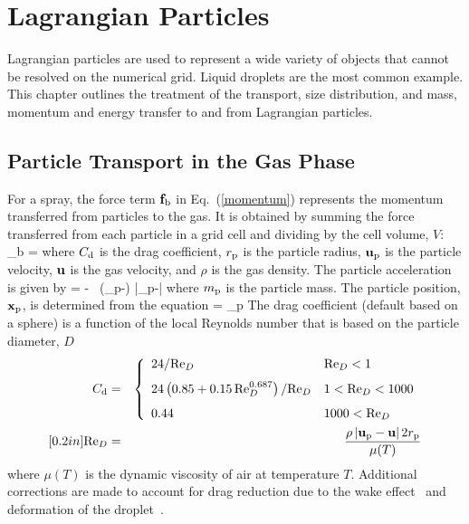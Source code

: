 
\chapter{Lagrangian Particles}
\label{chapter:lagrangian_particles}

Lagrangian particles are used to represent a wide variety of objects that cannot be resolved on
the numerical grid. Liquid droplets are the most common example. This chapter outlines the treatment of the transport, size
distribution, and mass, momentum and energy transfer to and from Lagrangian particles.

\section{Particle Transport in the Gas Phase}

For a spray, the force term ${\bf f}_{\rm b}$ in Eq.~(\ref{momentum})
represents the momentum transferred from particles to the gas.
It is obtained by summing the force transferred from each particle
in a grid cell and dividing by the cell volume, $V$:
\be
    {\bof_{\rm b}} =  \sum {}
\ee
where $C_{\rm d}$ is the drag coefficient, $r_{\rm p}$ is the particle radius, ${\bf u}_{\rm p}$ is the particle velocity, ${\bf u}$ is the
gas velocity, and $\rho$ is the gas density. The particle acceleration is given by
\be
     = \bg - \ha {} \,
    (\bu_{\rm p}-\bu) |\bu_{\rm p}-\bu|
\ee
where $m_{\rm p}$ is the particle mass.  The particle position, ${\bf x}_{\rm p}$, is determined from the equation
\be
     = \bu_{\rm p}
\ee
The drag coefficient (default based on a sphere) is a function of the local Reynolds number that is based on the particle diameter, $D$
\begin{eqnarray}
 C_{\rm d} &=& \left\{ \begin{array}{ll}
     24/\hbox{Re}_D                                          & \hbox{Re}_D < 1    \\ [0.1in]
     24\left(0.85+0.15 \, \hbox{Re}_D^{0.687} \right)/\hbox{Re}_D  & 1 < \hbox{Re}_D < 1000 \\ [0.1in]
     0.44                                              & 1000 < \hbox{Re}_D
     \end{array} \right.  \\ [0.2in]
\hbox{Re}_D &=& \frac{\rho \, |{\bf u}_{\rm p}-{\bf u}| \, 2 r_{\rm p}}{\mu(T)} \end{eqnarray}
where $\mu(T)$ is the dynamic viscosity of air at temperature $T$. Additional corrections are made to account for drag reduction due to the wake effect~\cite{Ramirez:1} and deformation of the droplet~\cite{Loth:1}.


